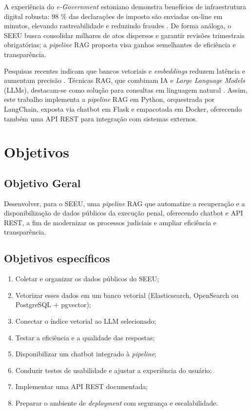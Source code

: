 A experiência do \emph{e-Government} estoniano demonstra benefícios de
infraestrutura digital robusta: 98 \% das declarações de imposto são enviadas
on-line em minutos, elevando rastreabilidade e reduzindo fraudes
\cite{divald2021eformalization}. De forma análoga, o SEEU busca consolidar
milhares de atos dispersos e garantir revisões trimestrais obrigatórias; a
\emph{pipeline} RAG proposta visa ganhos semelhantes de eficiência e
transparência.

Pesquisas recentes indicam que bancos vetoriais e \emph{embeddings} reduzem
latência e aumentam precisão \cite{taipalus2024vector,gao2023survey}. Técnicas
RAG, que combinam IA e \emph{Large Language Models} (LLMs), destacam-se como
solução para consultas em linguagem natural \cite{qwak2024integrating,
pujiono2024implementing}. Assim, este trabalho implementa a \emph{pipeline}
RAG em Python, orquestrada por LangChain, exposta via chatbot em Flask e
empacotada em Docker, oferecendo também uma API REST para integração com
sistemas externos.


\section{Objetivos}
\label{sec:objetivos}

\subsection{Objetivo Geral}
Desenvolver, para o SEEU, uma \emph{pipeline} RAG que automatize a recuperação
e a disponibilização de dados públicos da execução penal, oferecendo chatbot e
API REST, a fim de modernizar os processos judiciais e ampliar eficiência e
transparência.

\subsection{Objetivos específicos}
\begin{enumerate}[label=\arabic*.]
  \item Coletar e organizar os dados públicos do SEEU;
  \item Vetorizar esses dados em um banco vetorial (Elasticsearch, OpenSearch
        ou PostgreSQL + pgvector);
  \item Conectar o índice vetorial ao LLM selecionado;
  \item Testar a eficiência e a qualidade das respostas;
  \item Disponibilizar um chatbot integrado à \emph{pipeline};
  \item Conduzir testes de usabilidade e ajustar a experiência do usuário;
  \item Implementar uma API REST documentada;
  \item Preparar o ambiente de \emph{deployment} com segurança e
        escalabilidade.
\end{enumerate}

